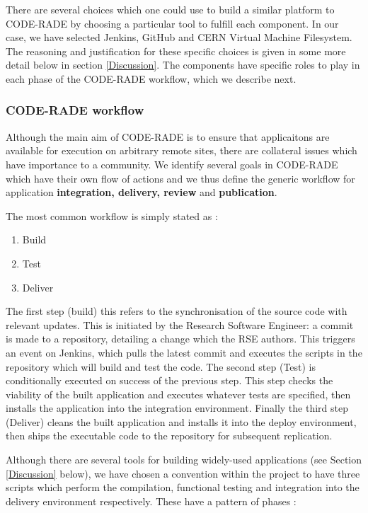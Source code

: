\documentclass[a4paper]{jpconf}
\begin{document}
	There are several choices  which one could use to build a similar platform to CODE-RADE by choosing a particular tool to fulfill each component. In our case, we have selected Jenkins\cite{Jenkins}, GitHub\cite{Github} and CERN Virtual Machine Filesystem\cite{CVMFS}. The reasoning and justification for these specific choices is given in some more detail below in section \ref{Discussion}. The components have specific roles to play in each phase of the CODE-RADE workflow, which we describe next.

	\subsubsection{CODE-RADE workflow}

	Although the main aim of CODE-RADE is to ensure that applicaitons are available for execution on arbitrary remote sites, there are collateral issues which have importance to a community. We identify several goals in CODE-RADE which have their own flow of actions and we thus define the generic workflow for application {\bf integration, delivery, review} and {\bf publication}.

	The most common workflow is simply stated as :

	\begin{enumerate}[label=\arabic*]
		\item Build
		\item Test
		\item Deliver
	\end{enumerate}

	The first step (build) this refers to the synchronisation of the source code with relevant updates. This is initiated by the Research Software Engineer: a commit is made to a repository, detailing a change which the RSE authors. This triggers an event on Jenkins, which pulls the latest commit and executes the scripts in the repository which will build and test the code. The second step (Test) is conditionally executed on success of the previous step. This step checks the viability of the built application and executes whatever tests are specified, then installs the application into the integration environment. Finally the third step (Deliver) cleans the built application and installs it into the deploy environment, then ships the executable code to the repository for subsequent replication.

	Although there are several tools for building widely-used applications (see Section \ref{Discussion} below), we have chosen a convention within the project to have three scripts which perform the compilation, functional testing and integration into the delivery environment respectively. These have a pattern of phases :
\end{document}
